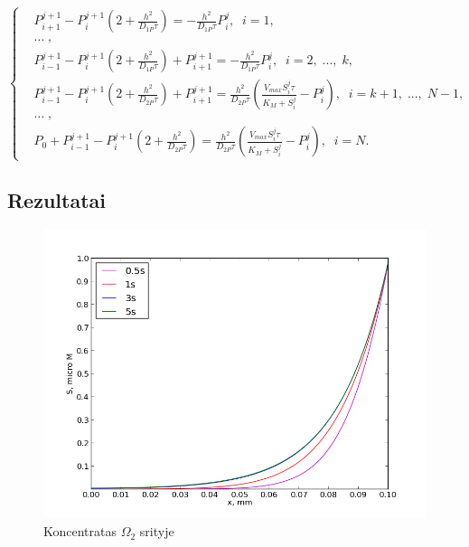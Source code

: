 \documentclass[12pt, a4paper, lithuanian]{article}
\begin{document}
\begin{equation}
\left\{
\begin{aligned}
    &P_{i+1}^{j+1}-P_i^{j+1}\left(2+\frac{h^2}{D_{1P}\tau}\right)
    = -\frac{h^2}{D_{1P}\tau} P_i^j,\; \; i = 1,\\
    &\dots\;,\\
    &P_{i-1}^{j+1}-P_i^{j+1}\left(2+\frac{h^2}{D_{1P}\tau}\right)+P_{i+1}^{j+1}
    =-\frac{h^2}{D_{1P}\tau} P_i^j,\; \; i = 2,\;...,\;k,\\
    &P_{i-1}^{j+1}-P_i^{j+1}\left(2+\frac{h^2}{D_{2P}\tau}\right)+P_{i+1}^{j+1}
    = \frac{h^2}{D_{2P}\tau}
    \left(\frac{V_{max}S_i^j\tau}{K_M+S_i^j}-P_i^j\right),\; \; i =
        k +1,\;...,\;N-1,\\
    &\dots\;,\\
    &P_0 + P_{i-1}^{j+1} - P_i^{j+1}\left(2+\frac{h^2}{D_{2P}\tau}\right)
        =  \frac{h^2}{D_{2P}\tau}
        \left(\frac{V_{max}S_i^j\tau}{K_M+S_i^j}-P_i^j\right),\; \; i = N.
\end{aligned}
\right.
\end{equation}

\subsection{Rezultatai}
 \begin{figure}[H]
     \centering
     \includegraphics[scale=0.5]{img/kurS}
     \caption{Koncentratas $\Omega_2$ srityje}
     \label{img:mlp}
 \end{figure}
 
\end{document}
